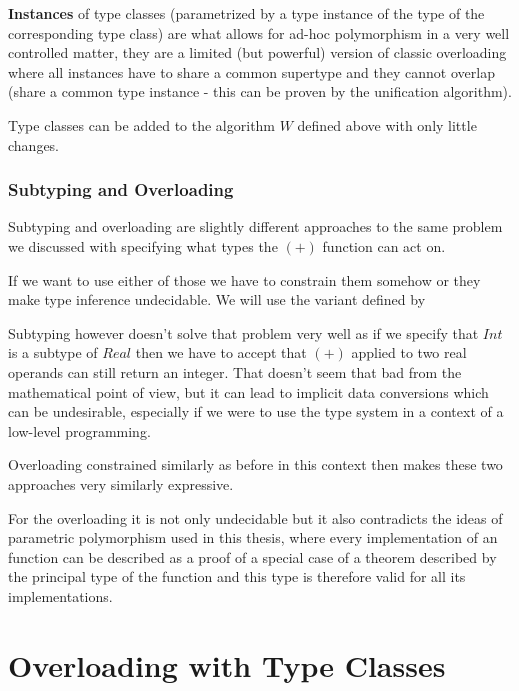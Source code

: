 \textbf{Instances} of type classes (parametrized by a type instance of the type of the corresponding type class) are what allows for ad-hoc polymorphism %
in a very well controlled matter, they are a limited (but powerful) version of classic overloading where all instances have to share a common supertype and they cannot overlap (share a common type instance - this can be proven by the unification algorithm).

Type classes can be added to the algorithm $W$ defined above with only little changes. %

\subsubsection{Subtyping and Overloading}


Subtyping and overloading are slightly different approaches to the same problem we discussed with specifying what types the $(+)$ function can act on.

If we want to use either of those we have to constrain them somehow or they make type inference undecidable. We will use the variant defined by %

Subtyping however doesn't solve that problem very well as if we specify that $Int$ is a subtype of $Real$ then we have to accept that $(+)$ applied to two real operands can still return an integer. That doesn't seem that bad from the mathematical point of view, but it can lead to implicit data conversions which can be undesirable, especially if we were to use the type system in a context of a low-level programming. %

Overloading constrained similarly as before in this context then makes these two approaches very similarly expressive. %

For the overloading it is not only undecidable but it also contradicts the ideas of parametric polymorphism used in this thesis, where every implementation of an function can be described as a proof of a special case of a theorem described by the principal type of the function and this type is therefore valid for all its implementations. %

\section{Overloading with Type Classes}

